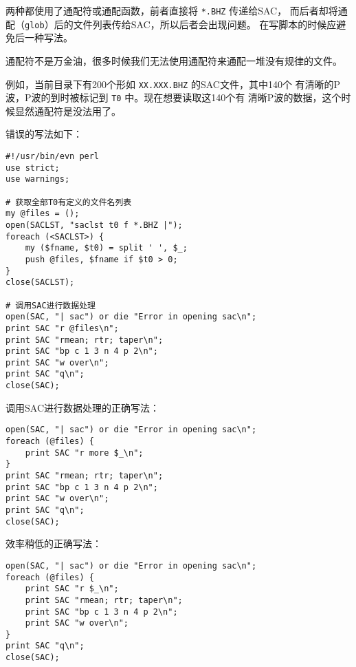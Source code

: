 两种都使用了通配符或通配函数，前者直接将 \texttt{*.BHZ} 传递给SAC，
而后者却将通配（\texttt{glob}）后的文件列表传给SAC，所以后者会出现问题。
在写脚本的时候应避免后一种写法。

通配符不是万金油，很多时候我们无法使用通配符来通配一堆没有规律的文件。

例如，当前目录下有200个形如 \texttt{XX.XXX.BHZ} 的SAC文件，其中140个
有清晰的P波，P波的到时被标记到 \texttt{T0} 中。现在想要读取这140个有
清晰P波的数据，这个时候显然通配符是没法用了。

错误的写法如下：
\begin{verbatim}
#!/usr/bin/evn perl
use strict;
use warnings;

# 获取全部T0有定义的文件名列表
my @files = ();
open(SACLST, "saclst t0 f *.BHZ |");
foreach (<SACLST>) {
    my ($fname, $t0) = split ' ', $_;
    push @files, $fname if $t0 > 0;
}
close(SACLST);

# 调用SAC进行数据处理
open(SAC, "| sac") or die "Error in opening sac\n";
print SAC "r @files\n";
print SAC "rmean; rtr; taper\n";
print SAC "bp c 1 3 n 4 p 2\n";
print SAC "w over\n";
print SAC "q\n";
close(SAC);
\end{verbatim}

调用SAC进行数据处理的正确写法：
\begin{verbatim}
open(SAC, "| sac") or die "Error in opening sac\n";
foreach (@files) {
    print SAC "r more $_\n";
}
print SAC "rmean; rtr; taper\n";
print SAC "bp c 1 3 n 4 p 2\n";
print SAC "w over\n";
print SAC "q\n";
close(SAC);
\end{verbatim}

效率稍低的正确写法：
\begin{verbatim}
open(SAC, "| sac") or die "Error in opening sac\n";
foreach (@files) {
    print SAC "r $_\n";
    print SAC "rmean; rtr; taper\n";
    print SAC "bp c 1 3 n 4 p 2\n";
    print SAC "w over\n";
}
print SAC "q\n";
close(SAC);
\end{verbatim}
